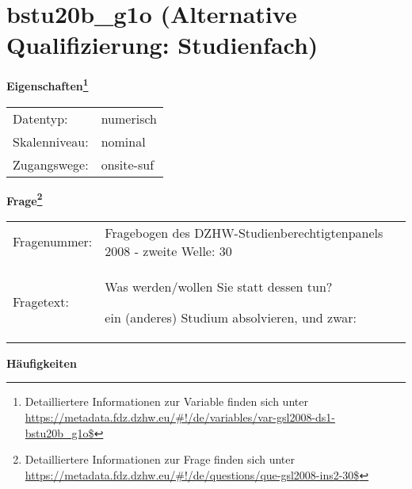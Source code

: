 
    \setcounter{footnote}{0}

    \vspace*{-1.8cm}
	\section{bstu20b\_g1o (Alternative Qualifizierung: Studienfach)}
	\label{section:bstu20b_g1o}



    \vspace*{0.5cm}
    \noindent\textbf{Eigenschaften\footnote{Detailliertere Informationen zur Variable finden sich unter
		\url{https://metadata.fdz.dzhw.eu/\#!/de/variables/var-gsl2008-ds1-bstu20b_g1o$}}}\\
	\begin{tabularx}{\hsize}{@{}lX}
	Datentyp: & numerisch \\
	Skalenniveau: & nominal \\
	Zugangswege: &
	  onsite-suf
 \\
    \end{tabularx}



				\vspace*{0.5cm}
                \noindent\textbf{Frage\footnote{Detailliertere Informationen zur Frage finden sich unter
		              \url{https://metadata.fdz.dzhw.eu/\#!/de/questions/que-gsl2008-ins2-30$}}}\\
				\begin{tabularx}{\hsize}{@{}lX}
					Fragenummer: &
					  Fragebogen des DZHW-Studienberechtigtenpanels 2008 - zweite Welle:
					  30
 \\
					Fragetext: & Was werden/wollen Sie statt dessen tun?\par  ein (anderes) Studium absolvieren, und zwar: \\
				\end{tabularx}





        		\vspace*{0.5cm}
                \noindent\textbf{Häufigkeiten}

